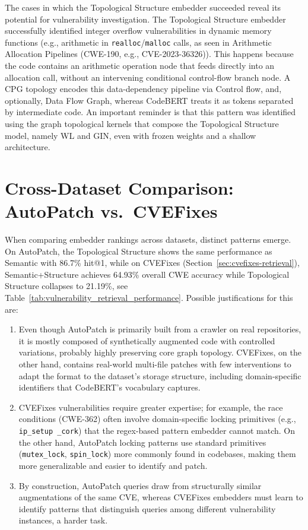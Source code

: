 The cases in which the Topological Structure embedder succeeded reveal its potential for vulnerability investigation. 
The Topological Structure embedder successfully identified integer overflow vulnerabilities in dynamic memory functions (e.g., arithmetic in \texttt{realloc}/\texttt{malloc} calls, as seen in Arithmetic Allocation Pipelines (CWE-190, e.g., CVE-2023-36326)). 
This happens because the code contains an arithmetic operation node that feeds directly into an allocation call, without an intervening conditional control-flow branch node. A CPG topology encodes this data-dependency pipeline via Control flow, and, optionally, Data Flow Graph, whereas CodeBERT treats it as tokens separated by intermediate code. 
An important reminder is that this pattern was identified using the graph topological kernels that compose the Topological Structure model, namely WL and GIN, even with frozen weights and a shallow architecture.



\section{Cross-Dataset Comparison: AutoPatch vs.\ CVEFixes}

When comparing embedder rankings across datasets, distinct patterns emerge.
On AutoPatch, the Topological Structure shows the same performance as Semantic with 86.7\% hit@1, while on CVEFixes (Section~\ref{sec:cvefixes-retrieval}), Semantic+Structure achieves 64.93\% overall CWE accuracy while Topological Structure collapses to 21.19\%, see Table~\ref{tab:vulnerability_retrieval_performance}.
Possible justifications for this are:

\begin{enumerate}
  \item Even though AutoPatch is primarily built from a crawler on real repositories, it is mostly composed of synthetically augmented code with controlled variations, probably highly preserving core graph topology.
    CVEFixes, on the other hand, contains real-world multi-file patches with few interventions to adapt the format to the dataset's storage structure, including domain-specific identifiers that CodeBERT's vocabulary captures.
  \item CVEFixes vulnerabilities require greater expertise; for example, the race conditions (CWE-362) often involve domain-specific locking primitives (e.g., \texttt{ip\_setup \_cork}) that the regex-based pattern embedder cannot match.
        On the other hand, AutoPatch locking patterns use standard primitives (\texttt{mutex\_lock}, \texttt{spin\_lock}) more commonly found in codebases, making them more generalizable and easier to identify and patch.
  \item By construction, AutoPatch queries draw from structurally similar augmentations of the same CVE, whereas CVEFixes embedders must learn to identify patterns that distinguish queries among different vulnerability instances, a harder task.
\end{enumerate}

